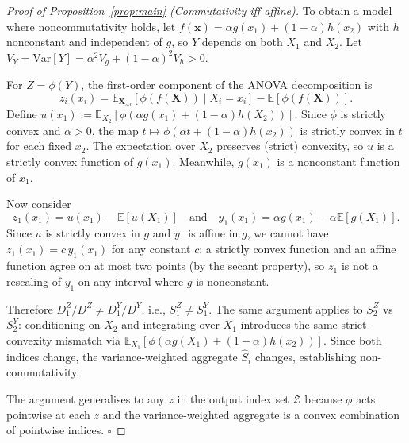 \documentclass[11pt,onecolumn]{article}
\begin{document}
\begin{proof}[Proof of Proposition~\ref{prop:main} (Commutativity iff affine)]
To obtain a model where noncommutativity holds, let
$f(\mathbf{x}) = \alpha g(x_1) + (1-\alpha) h(x_2)$ with $h$ nonconstant and
independent of $g$, so $Y$ depends on both $X_1$ and $X_2$.
Let $V_Y = \mathrm{Var}[Y] = \alpha^2 V_{g} + (1-\alpha)^2 V_h > 0$.

For $Z = \phi(Y)$, the first-order component of the ANOVA decomposition is
\[
  z_i(x_i) = \mathbb{E}_{\mathbf{X}_{\sim i}}[\phi(f(\mathbf{X})) \mid X_i = x_i]
            - \mathbb{E}[\phi(f(\mathbf{X}))].
\]
Define $u(x_1) := \mathbb{E}_{X_2}[\phi(\alpha g(x_1) + (1-\alpha)h(X_2))]$.
Since $\phi$ is strictly convex and $\alpha > 0$, the map
$t \mapsto \phi(\alpha t + (1-\alpha)h(x_2))$ is strictly convex in $t$
for each fixed $x_2$.  The expectation over $X_2$ preserves (strict)
convexity, so $u$ is a strictly convex function of $g(x_1)$.
Meanwhile, $g(x_1)$ is a nonconstant function of $x_1$.

Now consider
\[
  z_1(x_1) = u(x_1) - \mathbb{E}[u(X_1)] \quad\text{and}\quad
  y_1(x_1) = \alpha g(x_1) - \alpha\mathbb{E}[g(X_1)].
\]
Since $u$ is strictly convex in $g$ and $y_1$ is affine in $g$, we cannot
have $z_1(x_1) = c\, y_1(x_1)$ for any constant $c$: a strictly convex
function and an affine function agree on at most two points (by the secant
property), so $z_1$ is not a rescaling of $y_1$ on any interval where $g$
is nonconstant.

Therefore $D_1^Z / D^Z \neq D_1^Y / D^Y$, i.e., $S_1^Z \neq S_1^Y$.
The same argument applies to $S_2^Z$ vs $S_2^Y$: conditioning on $X_2$
and integrating over $X_1$ introduces the same strict-convexity mismatch
via $\mathbb{E}_{X_1}[\phi(\alpha g(X_1) + (1-\alpha)h(x_2))]$.
Since both indices change, the variance-weighted aggregate $\hat{S}_i$
changes, establishing non-commutativity.

The argument generalises to any $z$ in the output index set $\mathcal{Z}$
because $\phi$ acts pointwise at each $z$ and the variance-weighted
aggregate is a convex combination of pointwise indices.  $\square$
\end{proof}
\end{document}
